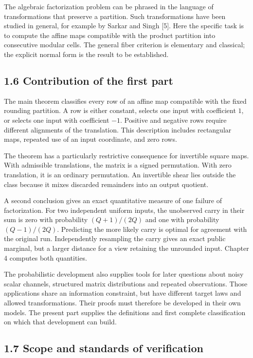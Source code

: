 \documentclass[
]{article}
\begin{document}
The algebraic factorization problem can be phrased in the language of
transformations that preserve a partition. Such transformations have
been studied in general, for example by Sarkar and Singh {[}5{]}. Here
the specific task is to compute the affine maps compatible with the
product partition into consecutive modular cells. The general fiber
criterion is elementary and classical; the explicit normal form is the
result to be established.

\subsection{1.6 Contribution of the first
part}\label{contribution-of-the-first-part}

The main theorem classifies every row of an affine map compatible with
the fixed rounding partition. A row is either constant, selects one
input with coefficient \(1\), or selects one input with coefficient
\(-1\). Positive and negative rows require different alignments of the
translation. This description includes rectangular maps, repeated use of
an input coordinate, and zero rows.

The theorem has a particularly restrictive consequence for invertible
square maps. With admissible translations, the matrix is a signed
permutation. With zero translation, it is an ordinary permutation. An
invertible shear lies outside the class because it mixes discarded
remainders into an output quotient.

A second conclusion gives an exact quantitative measure of one failure
of factorization. For two independent uniform inputs, the unobserved
carry in their sum is zero with probability \((Q+1)/(2Q)\) and one with
probability \((Q-1)/(2Q)\). Predicting the more likely carry is optimal
for agreement with the original run. Independently resampling the carry
gives an exact public marginal, but a larger distance for a view
retaining the unrounded input. Chapter 4 computes both quantities.

The probabilistic development also supplies tools for later questions
about noisy scalar channels, structured matrix distributions and
repeated observations. Those applications share an information
constraint, but have different target laws and allowed transformations.
Their proofs must therefore be developed in their own models. The
present part supplies the definitions and first complete classification
on which that development can build.

\subsection{1.7 Scope and standards of
verification}\label{scope-and-standards-of-verification}
\end{document}
